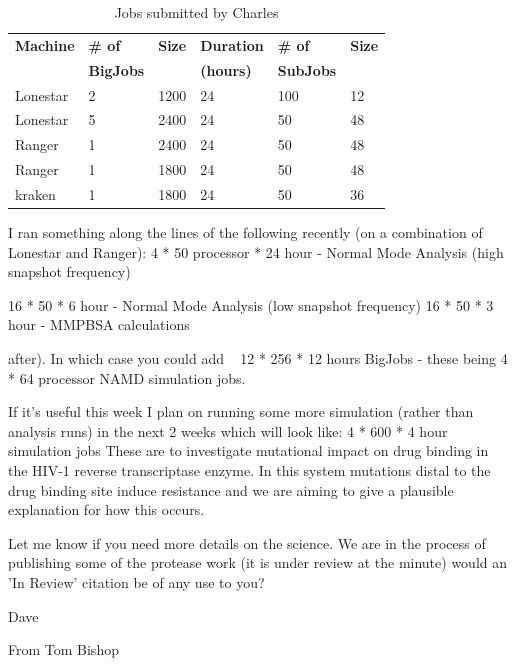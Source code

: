 \documentclass{sig-alternate}
\begin{document}
\begin{table}[h]
\begin{center}
\begin{tabular}{p{1.1cm}p{1.2cm}p{0.8cm}p{1.2cm}p{1.1cm}p{0.8cm}}
\toprule
\textbf{Machine}  & 
\textbf{\# of}    &
\textbf{Size}     & 
\textbf{Duration} & 
\textbf{\# of}    &
\textbf{Size}     \\
                  &
\textbf{BigJobs}  &
                  &
\textbf{(hours)}  &
\textbf{SubJobs}  &
                  \\ \midrule
Lonestar & 2 & 1200 & 24 & 100 & 12 \\ \midrule
Lonestar & 5 & 2400 & 24 &  50 & 48 \\ \midrule
Ranger   & 1 & 2400 & 24 &  50 & 48 \\ \midrule
Ranger   & 1 & 1800 & 24 &  50 & 48 \\ \midrule
kraken   & 1 & 1800 & 24 &  50 & 36 \\ \bottomrule
\end{tabular}
\caption{Jobs submitted by Charles}
\label{table:results}
\end{center}
\end{table}




I ran something along the lines of the following recently (on a combination of Lonestar and Ranger):
4 * 50 processor * 24 hour - Normal Mode Analysis (high snapshot frequency)

16 * 50 * 6 hour - Normal Mode Analysis (low snapshot frequency)
16 * 50 * 3 hour - MMPBSA calculations

after). In which case you could add ~ 12 * 256 * 12 hours BigJobs - these being 4 * 64 processor NAMD simulation jobs.

If it's useful this week I plan on running some more simulation (rather than analysis runs) in the next 2 weeks which will look like:
4 * 600 * 4 hour simulation jobs
These are to investigate mutational impact on drug binding in the HIV-1 reverse transcriptase enzyme. In this system mutations distal to the drug binding site induce resistance and we are aiming to give a plausible explanation for how this occurs.

Let me know if you need more details on the science. We are in the process of publishing some of the protease work (it is under review at the minute) would an 'In Review' citation be of any use to you?

Dave


From Tom Bishop
\end{document}
